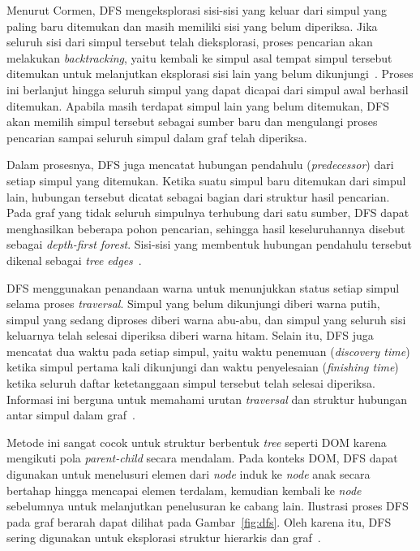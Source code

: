 Menurut Cormen, DFS mengeksplorasi sisi-sisi yang keluar dari simpul yang paling baru ditemukan dan masih memiliki sisi yang belum diperiksa. Jika seluruh sisi dari simpul tersebut telah dieksplorasi, proses pencarian akan melakukan {\it backtracking}, yaitu kembali ke simpul asal tempat simpul tersebut ditemukan untuk melanjutkan eksplorasi sisi lain yang belum dikunjungi~\cite{cormen:22:introalgo}. Proses ini berlanjut hingga seluruh simpul yang dapat dicapai dari simpul awal berhasil ditemukan. Apabila masih terdapat simpul lain yang belum ditemukan, DFS akan memilih simpul tersebut sebagai sumber baru dan mengulangi proses pencarian sampai seluruh simpul dalam graf telah diperiksa.

Dalam prosesnya, DFS juga mencatat hubungan pendahulu ({\it predecessor}) dari setiap simpul yang ditemukan. Ketika suatu simpul baru ditemukan dari simpul lain, hubungan tersebut dicatat sebagai bagian dari struktur hasil pencarian. Pada graf yang tidak seluruh simpulnya terhubung dari satu sumber, DFS dapat menghasilkan beberapa pohon pencarian, sehingga hasil keseluruhannya disebut sebagai {\it depth-first forest}. Sisi-sisi yang membentuk hubungan pendahulu tersebut dikenal sebagai {\it tree edges}~\cite{cormen:22:introalgo}.

DFS menggunakan penandaan warna untuk menunjukkan status setiap simpul selama proses \textit{traversal}. Simpul yang belum dikunjungi diberi warna putih, simpul yang sedang diproses diberi warna abu-abu, dan simpul yang seluruh sisi keluarnya telah selesai diperiksa diberi warna hitam. Selain itu, DFS juga mencatat dua waktu pada setiap simpul, yaitu waktu penemuan ({\it discovery time}) ketika simpul pertama kali dikunjungi dan waktu penyelesaian ({\it finishing time}) ketika seluruh daftar ketetanggaan simpul tersebut telah selesai diperiksa. Informasi ini berguna untuk memahami urutan \textit{traversal} dan struktur hubungan antar simpul dalam graf~\cite{cormen:22:introalgo}.

Metode ini sangat cocok untuk struktur berbentuk \textit{tree} seperti DOM karena mengikuti pola \textit{parent-child} secara mendalam. Pada konteks DOM, DFS dapat digunakan untuk menelusuri elemen dari \textit{node} induk ke \textit{node} anak secara bertahap hingga mencapai elemen terdalam, kemudian kembali ke \textit{node} sebelumnya untuk melanjutkan penelusuran ke cabang lain. Ilustrasi proses DFS pada graf berarah dapat dilihat pada Gambar~\ref{fig:dfs}. Oleh karena itu, DFS sering digunakan untuk eksplorasi struktur hierarkis dan graf~\cite{cormen:22:introalgo}.

